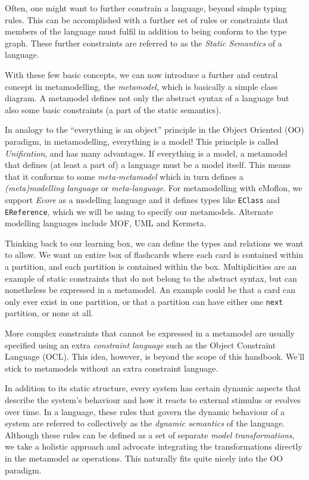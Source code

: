 Often, one might want to further constrain a language, beyond simple typing rules. This can be accomplished with a further set of rules or constraints that
members of the language must fulfil in addition to being conform to the type graph. These further constraints are referred to as the
\emph{Static Semantics} of a language.

With these few basic concepts, we can now introduce a further and central concept in metamodelling, the \emph{metamodel}, which is basically a
simple class diagram. A metamodel defines not only the abstract syntax of a language but also some basic constraints (a part of the static semantics).

In analogy to the ``everything is an object'' principle in the Object Oriented (OO) paradigm, in metamodelling, everything is a model! This
principle is called \emph{Unification},  and has many advantages. If everything is a model, a metamodel that defines (at least a part
of) a language must be a model itself. This means that it conforms to some \emph{meta-metamodel} which in turn defines a 
\emph{(meta)modelling language} or \emph{meta-language}. For metamodelling with eMoflon, we support \emph{Ecore} as a modelling language
and it defines types like \texttt{EClass} and \texttt{EReference}, which we will be using to specify  our metamodels. Alternate modelling languages include MOF,
UML and Kermeta.

Thinking back to our learning box, we can define the types and relations we want to allow. We want an entire box of flashcards where each card is contained
within a partition, and each partition is contained within the box. Multiplicities are an example of static constraints that do not belong to the abstract
syntax, but can nonetheless be expressed in a metamodel. An example could be that a card can only ever exist in one partition, or that a partition can have
either one \texttt{next} partition, or none at all.

More complex constraints that cannot be expressed in a metamodel are usually specified using an extra \emph{constraint language}
such as the Object Constraint Language (OCL). This idea, however,  is beyond the scope of this handbook. We'll stick to metamodels without an extra
constraint language.

In addition to its static structure, every system has certain dynamic aspects that describe the system's behaviour and how it reacts to external stimulus or
evolves over time. In a language, these rules that govern the dynamic behaviour of a system are referred to collectively as the
\emph{dynamic semantics} of the language. Although these rules can be defined as a set of separate \emph{model transformations}, we
take a holistic approach and advocate integrating the transformations directly in the metamodel as operations. This naturally fits quite nicely into the OO
paradigm.

